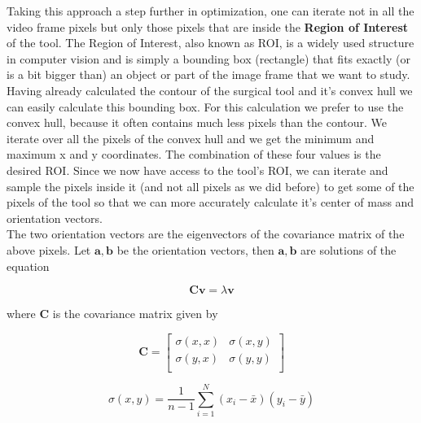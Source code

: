 Taking this approach a step further in optimization, one can iterate not in all the video frame pixels but only those pixels 
that are inside the \textbf{Region of Interest} of the tool. The Region of Interest, also known as ROI, is a widely used structure in computer vision and is simply a bounding box (rectangle) that fits exactly 
(or is a bit bigger than) an object or part of the image frame that we want to study. Having already calculated the contour of the surgical tool and it's convex hull we can easily calculate this bounding box. 
For this calculation we prefer to use the convex hull, because it often contains much less pixels than the contour. We iterate over all the pixels of the convex hull and we get the minimum and maximum x and y 
coordinates. The combination of these four values is the desired ROI. Since we now have access to the tool's ROI, we can iterate and sample the pixels inside it (and not all pixels as we did before) to get 
some of the pixels of the tool so that we can more accurately calculate it's center of mass and orientation vectors. \\

The two orientation vectors are the eigenvectors of the covariance matrix of the above pixels. Let $\mathbf{a},\mathbf{b}$ be the orientation vectors, 
then $\mathbf{a},\mathbf{b}$ are solutions of the equation

\begin{equation}
\mathbf{C} \mathbf{v} = λ \mathbf{v}
\end{equation}

where $\mathbf{C}$ is the covariance matrix given by

\begin{equation}
\label{eq:cov-matrix}
\mathbf{C} = \begin{bmatrix}
σ(x,x) & σ(x,y) \\
σ(y,x) & σ(y,y) \\
\end{bmatrix}
\end{equation}

\begin{equation}
\label{eq:cov-matrix-coeff}
σ(x,y) = \frac{1}{n-1} \sum_{i=1}^{N} ( x_i - \bar{x} )( y_i - \bar{y} )
\end{equation}

